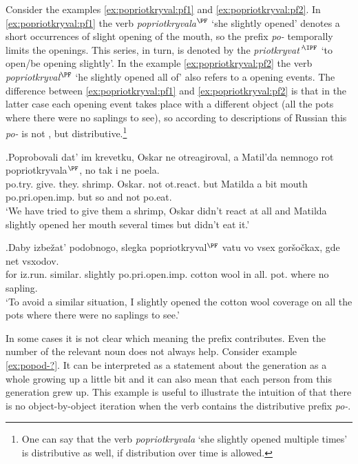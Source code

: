 Consider the examples \ref{ex:popriotkryval:pf1} and \ref{ex:popriotkryval:pf2}. In \ref{ex:popriotkryval:pf1} the verb \textit{popriotkryvala}$^{\PF}$ `she slightly opened' denotes a short  occurrences of slight opening of the mouth, so the prefix \textit{po-} temporally limits the  openings. This series, in turn, is denoted by the  \textit{priotkryvat'}$^{\IPF}$ `to open/be opening slightly'. In the example \ref{ex:popriotkryval:pf2} the verb  \textit{popriotkryval}$^{\PF}$ `he slightly opened all of' also refers to a  opening events. The difference between \ref{ex:popriotkryval:pf1} and \ref{ex:popriotkryval:pf2} is that in the latter case each opening event takes place with a different object (all the pots where there were no saplings to see), so according to descriptions of Russian  this \textit{po-} is not , but distributive.\footnote{One can say that the verb \textit{popriotkryvala} `she slightly opened multiple times' is distributive as well, if distribution over time is allowed.}

\exg.\label{ex:popriotkryval:pf1}Poprobovali dat' im krevetku, Oskar ne otreagiroval, a Matil'da nemnogo rot popriotkryvala$^{\PF}$, no tak i ne poela.\\
po.try. give. they. shrimp. Oskar. not ot.react. but Matilda {a bit} mouth po.pri.open.imp. but so and not po.eat.\\
\trans `We have tried to give them a shrimp, Oskar didn't react at all and Matilda slightly opened her mouth several times but didn't eat it.'\\

\exg.\label{ex:popriotkryval:pf2}Daby izbe\v{z}at' podobnogo, slegka popriotkryval$^{\PF}$ vatu vo vsex gor\v{s}o\v{c}kax, gde net vsxodov.\\
for iz.run. similar. slightly po.pri.open.imp. {cotton wool} in all. pot. where no sapling.\\
\trans `To avoid a similar situation, I slightly opened the cotton wool coverage on all the pots where there were no saplings to see.'\\

In some cases it is not clear which meaning the prefix contributes. Even the number of the relevant noun does not always help. Consider example \ref{ex:popod-?}. It can be interpreted as a statement about the generation as a whole growing up a little bit and it can also mean that each person from this generation grew up. This example is useful to illustrate the intuition of \citet{Isachenko:60} that there is no object-by-object iteration when the verb contains the distributive prefix \textit{po-}.

